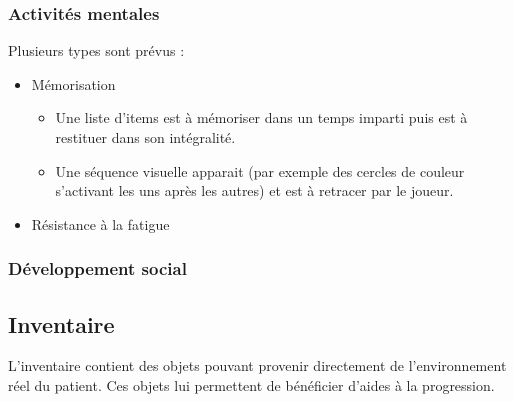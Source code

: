\documentclass[a4paper,12pt,francais]{article}
\begin{document}
\subsubsection{Activités mentales}
Plusieurs types sont prévus :
\begin{itemize}
	\item Mémorisation
		\begin{itemize}
			\item Une liste d'items est à mémoriser dans un temps imparti puis est à restituer dans son intégralité.
			\item Une séquence visuelle apparait (par exemple des cercles de couleur s'activant les uns après les autres) et est à retracer par le joueur.
		\end{itemize}
	\item Résistance à la fatigue
\end{itemize}
\subsubsection{Développement social}
\subsection{Inventaire}
L'inventaire contient des objets pouvant provenir directement de l'environnement réel du patient. Ces objets lui permettent de bénéficier d'aides à la progression.
\fi
\end{document}
